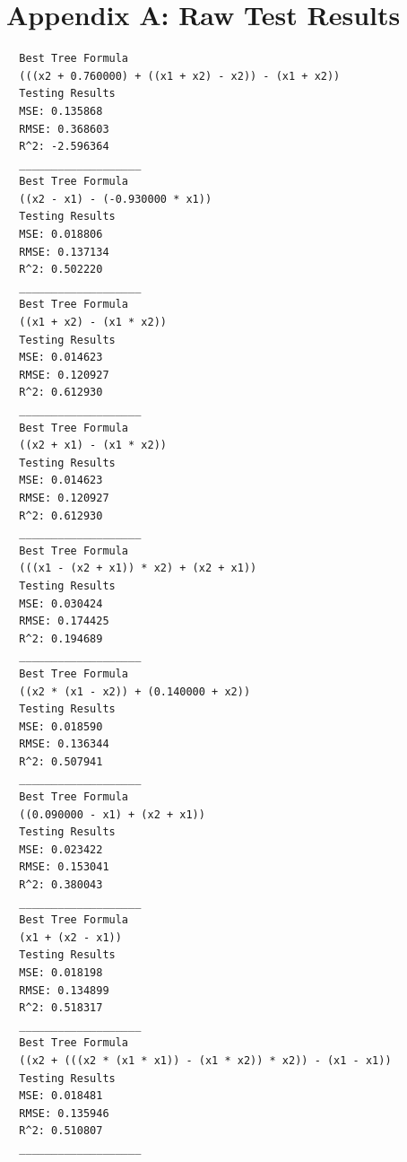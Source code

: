 \documentclass{article}
\begin{document}
\section{Appendix A: Raw Test Results}
\label{appendix:a}
\begin{verbatim}
  Best Tree Formula
  (((x2 + 0.760000) + ((x1 + x2) - x2)) - (x1 + x2))
  Testing Results
  MSE: 0.135868
  RMSE: 0.368603
  R^2: -2.596364
  ___________________
  Best Tree Formula
  ((x2 - x1) - (-0.930000 * x1))
  Testing Results
  MSE: 0.018806
  RMSE: 0.137134
  R^2: 0.502220
  ___________________
  Best Tree Formula
  ((x1 + x2) - (x1 * x2))
  Testing Results
  MSE: 0.014623
  RMSE: 0.120927
  R^2: 0.612930
  ___________________
  Best Tree Formula
  ((x2 + x1) - (x1 * x2))
  Testing Results
  MSE: 0.014623
  RMSE: 0.120927
  R^2: 0.612930
  ___________________
  Best Tree Formula
  (((x1 - (x2 + x1)) * x2) + (x2 + x1))
  Testing Results
  MSE: 0.030424
  RMSE: 0.174425
  R^2: 0.194689
  ___________________
  Best Tree Formula
  ((x2 * (x1 - x2)) + (0.140000 + x2))
  Testing Results
  MSE: 0.018590
  RMSE: 0.136344
  R^2: 0.507941
  ___________________
  Best Tree Formula
  ((0.090000 - x1) + (x2 + x1))
  Testing Results
  MSE: 0.023422
  RMSE: 0.153041
  R^2: 0.380043
  ___________________
  Best Tree Formula
  (x1 + (x2 - x1))
  Testing Results
  MSE: 0.018198
  RMSE: 0.134899
  R^2: 0.518317
  ___________________
  Best Tree Formula
  ((x2 + (((x2 * (x1 * x1)) - (x1 * x2)) * x2)) - (x1 - x1))
  Testing Results
  MSE: 0.018481
  RMSE: 0.135946
  R^2: 0.510807
  ___________________
\end{verbatim}



\end{document}
